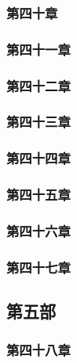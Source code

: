 \subsubsection{第四十章}



\subsubsection{第四十一章}



\subsubsection{第四十二章}



\subsubsection{第四十三章}



\subsubsection{第四十四章}



\subsubsection{第四十五章}



\subsubsection{第四十六章}



\subsubsection{第四十七章}










\subsection{第五部}

\subsubsection{第四十八章}



